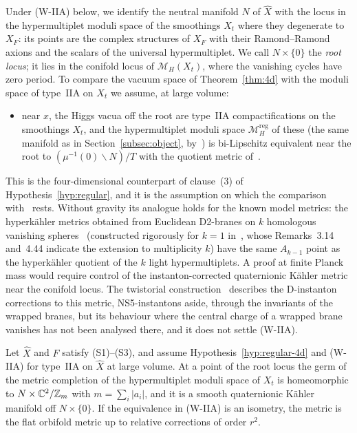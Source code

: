 Under (W-IIA) below, we identify the neutral manifold $N$ of $\widehat X$ with the locus in the hypermultiplet
moduli space of the smoothings $X_t$ where they degenerate to $X_F$: its points are the complex structures of $X_F$ with their
Ramond--Ramond axions and the scalars of the universal hypermultiplet. We call $N\times\{0\}$ the \emph{root locus}; it lies in the conifold
locus of $\mathcal M_H(X_t)$, where the vanishing cycles have zero period. To compare the vacuum space of
Theorem~\ref{thm:4d} with the moduli space of type~IIA on $X_t$ we assume, at large volume:
\begin{itemize}
\item[(W-IIA)] near $x$, the Higgs vacua off the root are type~IIA compactifications on the smoothings
$X_t$, and the hypermultiplet moduli space $\mathcal M_H^{\mathrm{reg}}$ of these (the same manifold as in
Section~\ref{subsec:object}, by~\cite[Sect.~2]{Strominger:1997}) is bi-Lipschitz
equivalent near the root to $(\mu^{-1}(0)\smallsetminus N)/T$ with the quotient metric
of~\cite{Galicki:1988}.
\end{itemize}
This is the four-dimensional counterpart of clause~(3) of Hypothesis~\ref{hyp:regular}, and it is the
assumption on which the comparison with~\cite{Greene:1996Confinement} rests. Without gravity its analogue
holds for the known model metrics: the hyperk\"ahler metrics obtained from Euclidean D2-branes on $k$
homologous vanishing spheres~\cite{OoguriVafa:1996,SeibergShenker:1996} (constructed rigorously for $k=1$
in~\cite{FredricksonZimet:2025}, whose Remarks~3.14 and~4.44 indicate the extension to multiplicity $k$)
have the same $A_{k-1}$ point as the hyperk\"ahler quotient of the $k$ light
hypermultiplets. A proof at finite Planck mass would require control of the instanton-corrected
quaternionic K\"ahler metric near the conifold locus. The twistorial construction~\cite{Alexandrov:2008gh} describes the D-instanton corrections to
this metric, NS5-instantons aside, through the invariants of the wrapped branes, but its behaviour where the central charge of a wrapped brane vanishes has not been
analysed there, and it does not settle (W-IIA).

\begin{corollary}\label{cor:gmv}
Let $\widehat X$ and $F$ satisfy (S1)--(S3), and assume Hypothesis~\ref{hyp:regular-4d} and (W-IIA) for
type~IIA on $\widehat X$ at large volume. At a point of the root locus the germ of the metric completion of
the hypermultiplet moduli space of $X_t$ is homeomorphic to $N\times\mathbb C^2/\mathbb Z_m$ with $m=\sum_i|a_i|$, and
it is a smooth quaternionic K\"ahler manifold off $N\times\{0\}$. If the equivalence in (W-IIA) is an
isometry, the metric is the flat orbifold metric up to relative corrections of order $r^2$.
\end{corollary}

